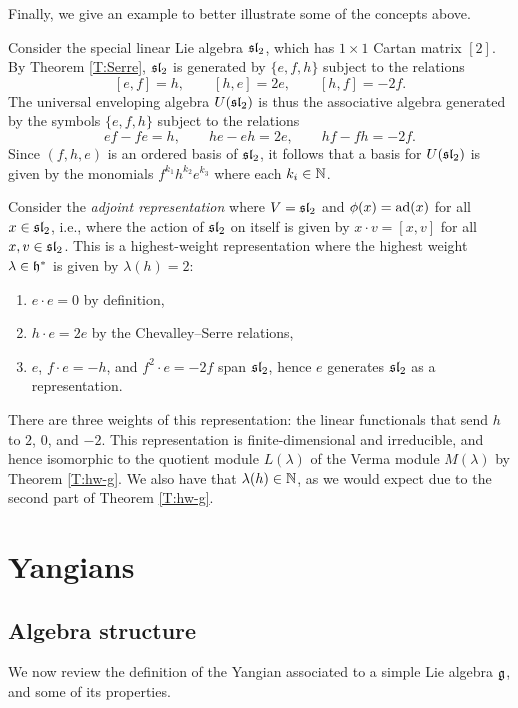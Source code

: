 Finally, we give an example to better illustrate some of the concepts above.

\begin{example}\label{E:sl2}
    Consider the special linear Lie algebra $\mathfrak{sl}_2$, which has $1\times 1$ Cartan matrix $[2]$.
    By Theorem \ref{T:Serre}, $\mathfrak{sl}_2$ is generated by $\{e,f,h\}$ subject to the relations
    \[[e,f]=h, \qquad [h,e]=2e, \qquad [h,f]=-2f.\]
    The universal enveloping algebra $U(\mathfrak{sl}_2)$ is thus the associative algebra generated by the symbols $\{e,f,h\}$ subject to the relations
    \[ef-fe=h, \qquad he-eh=2e, \qquad hf-fh=-2f.\]
    Since $(f,h,e)$ is an ordered basis of $\mathfrak{sl}_2$, it follows that a basis for $U(\mathfrak{sl}_2)$ is given by the monomials $f^{k_1}h^{k_2}e^{k_3}$ where each $k_i\in\mathbb{N}$.

    Consider the \emph{adjoint representation} where $V=\mathfrak{sl}_2$ and $\phi(x)=\operatorname{ad}(x)$ for all $x\in\mathfrak{sl}_2$, i.e., where the action of $\mathfrak{sl}_2$ on itself is given by $x\cdot v=[x,v]$ for all $x,v\in\mathfrak{sl}_2$.
    This is a highest-weight representation where the highest weight $\lambda\in\mathfrak{h}^*$ is given by $\lambda(h)=2$:
    \begin{enumerate}
        \item $e\cdot e = 0$ by definition,
        \item $h\cdot e = 2e$ by the Chevalley--Serre relations,
        \item $e$, $f\cdot e = -h$, and $f^2\cdot e = -2f$ span $\mathfrak{sl}_2$, hence $e$ generates $\mathfrak{sl}_2$ as a representation.
    \end{enumerate}
    There are three weights of this representation: the linear functionals that send $h$ to $2$, $0$, and $-2$.
    This representation is finite-dimensional and irreducible, and hence isomorphic to the quotient module $L(\lambda)$ of the Verma module $M(\lambda)$ by Theorem \ref{T:hw-g}.
    We also have that $\lambda(h)\in\mathbb{N}$, as we would expect due to the second part of Theorem \ref{T:hw-g}.
\end{example}


\section{Yangians}

\subsection{Algebra structure}

We now review the definition of the Yangian associated to a simple Lie algebra $\mathfrak{g}$, and some of its properties.

